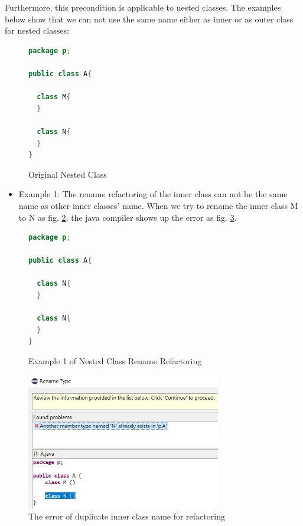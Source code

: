Furthermore, this precondition is applicable to nested classes. The examples below show that we can not use the same name either as inner or as outer class for nested classes:

\begin{figure}[th]
\centering
\begin{minipage}[t]{0.75\linewidth}
\begin{lstlisting}[language=java, basicstyle=\scriptsize\ttfamily,frame=single]
package p;

public class A{	

  class M{
  }

  class N{
  }
} 
\end{lstlisting}
\end{minipage}
\caption{Original Nested Class}
\label{fig:original}
\end{figure}
\begin{itemize}
\item Example 1: The rename refactoring of the inner class can not be the same name as other inner classes' name. When we try to rename the inner class M to N as fig. \ref{fig:nestedclass1}, the java compiler shows up the error as fig. \ref{fig:NC1}.
\end{itemize}

\begin{figure}[th]
\centering
\begin{minipage}[t]{0.75\linewidth}
\begin{lstlisting}[language=java, basicstyle=\scriptsize\ttfamily,frame=single]
package p;

public class A{	
    
  class N{
  }
    
  class N{
  }
} 
\end{lstlisting}
\end{minipage}
\caption{Example 1 of Nested Class Rename Refactoring}
\label{fig:nestedclass1}
\end{figure}

\begin{figure}[H]
\centerline{\includegraphics[width=85mm,scale=0.5]{NC1.jpg}}
\caption{The error of duplicate inner class name for refactoring}
\label{fig:NC1}
\end{figure}

